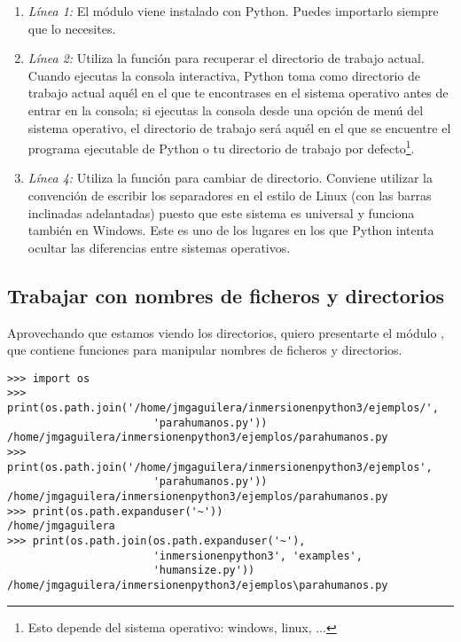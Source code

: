 \begin{enumerate}

\item \emph{Línea 1:} El módulo  viene instalado con Python. Puedes importarlo siempre que lo necesites.

\item \emph{Línea 2:} Utiliza la función  para recuperar el directorio de trabajo actual. Cuando ejecutas la consola interactiva, Python toma como directorio de trabajo actual aquél en el que te encontrases en el sistema operativo antes de entrar en la consola; si ejecutas la consola desde una opción de menú del sistema operativo, el directorio de trabajo será aquél en el que se encuentre el programa ejecutable de Python o tu directorio de trabajo por defecto\footnote{Esto depende del sistema operativo: windows, linux, ...}.

\item \emph{Línea 4:} Utiliza la función  para cambiar de directorio. Conviene utilizar la convención de escribir los separadores en el estilo de Linux (con las barras inclinadas adelantadas) puesto que este sistema es universal y funciona también en Windows. Este es uno de los lugares en los que Python intenta ocultar las diferencias entre sistemas operativos.

\end{enumerate}

\subsection{Trabajar con nombres de ficheros y directorios}

Aprovechando que estamos viendo los directorios, quiero presentarte el módulo , que contiene funciones para manipular nombres de ficheros y directorios.

\noindent\begin{minipage}{\textwidth}
\begin{lstlisting}[mathescape=True]
>>> import os
>>> print(os.path.join('/home/jmgaguilera/inmersionenpython3/ejemplos/', 
                       'parahumanos.py'))
/home/jmgaguilera/inmersionenpython3/ejemplos/parahumanos.py
>>> print(os.path.join('/home/jmgaguilera/inmersionenpython3/ejemplos', 
                       'parahumanos.py'))
/home/jmgaguilera/inmersionenpython3/ejemplos/parahumanos.py
>>> print(os.path.expanduser('~'))
/home/jmgaguilera
>>> print(os.path.join(os.path.expanduser('~'), 
                       'inmersionenpython3', 'examples', 
                       'humansize.py'))
/home/jmgaguilera/inmersionenpython3/ejemplos\parahumanos.py
\end{lstlisting}
\end{minipage}

